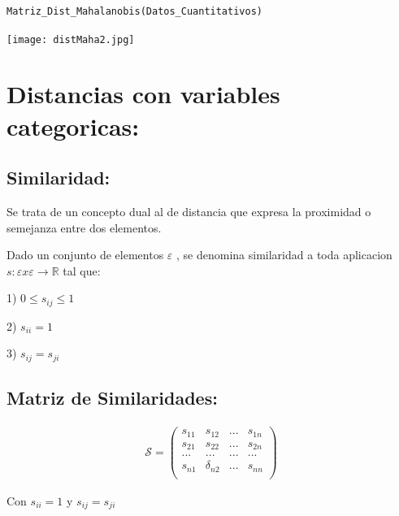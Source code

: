 \documentclass[12pt]{report} %
\begin{document}
\begin{lstlisting}
Matriz_Dist_Mahalanobis(Datos_Cuantitativos)
\end{lstlisting}

\texttt{[image: distMaha2.jpg]}

\newpage



\chapter{Distancias con variables categoricas:}
 
\section{Similaridad:}

Se trata de un concepto dual al de distancia que expresa la proximidad o semejanza entre dos elementos.

\begin{tcolorbox}[toptitle=2mm,title= Similaridad:   ]
Dado un conjunto de elementos $\varepsilon$ , se denomina similaridad a toda aplicacion \\ \hspace{1cm} $ s: \varepsilon x  \varepsilon \rightarrow \mathbb{R}$ \hspace{0.15cm} tal que:

1)\hspace{0.1cm} $0 \leq s_{ij} \leq   1$

2)\hspace{0.1cm} $s_{ii} = 1$

3)\hspace{0.1cm} $s_{ij} = s_{ji}$

\end{tcolorbox}

\section{Matriz de Similaridades:}

\begin{tcolorbox}[toptitle=2mm,title= Matriz de Similaridad:   ]

\begin{gather*}
\mathcal{S}= \begin{pmatrix}
s_{11} & s_{12}&...&s_{1n}\\
s_{21} & s_{22}&...&s_{2n}\\
...&...&...&...\\
s_{n1}& \delta_{n2}&...& s_{nn}\\
\end{pmatrix}
\end{gather*}

Con $s_{ii}=1$ y $s_{ij}=s_{ji}$

\end{tcolorbox}
\end{document}
